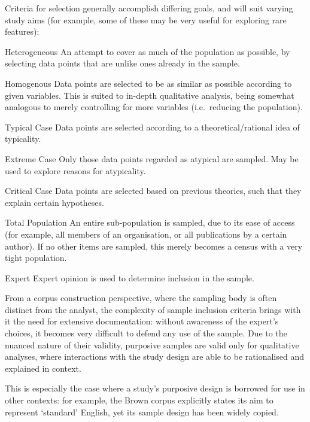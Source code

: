 Criteria for selection generally accomplish differing goals, and will suit varying study aims\cite{advice2000study} (for example, some of these may be very useful for exploring rare features):

\begin{itemizeTitle}
    \item[Heterogeneous] An attempt to cover as much of the population as possible, by selecting data points that are unlike ones already in the sample.
    \item[Homogenous] Data points are selected to be as similar as possible according to given variables.  This is suited to in-depth qualitative analysis, being somewhat analogous to merely controlling for more variables (i.e.\ reducing the population).
    \item[Typical Case] Data points are selected according to a theoretical/rational idea of typicality.
    \item[Extreme Case] Only those data points regarded as atypical are sampled.  May be used to explore reasons for atypicality.
    \item[Critical Case] Data points are selected based on previous theories, such that they explain certain hypotheses.
    \item[Total Population] An entire sub-population is sampled, due to its ease of access (for example, all members of an organisation, or all publications by a certain author).  If no other items are sampled, this merely becomes a census with a very tight population.
    \item[Expert] Expert opinion is used to determine inclusion in the sample.
\end{itemizeTitle}

From a corpus construction perspective, where the sampling body is often distinct from the analyst, the complexity of sample inclusion criteria brings with it the need for extensive documentation: without awareness of the expert's choices, it becomes very difficult to defend any use of the sample.  Due to the nuanced nature of their validity, purposive samples are valid only for qualitative analyses, where interactions with the study design are able to be rationalised and explained in context.

This is especially the case where a study's purposive design is borrowed for use in other contexts: for example, the Brown corpus explicitly states its aim to represent `standard' English, yet its sample design has been widely copied\cite{hundt1999manual,shastri1988kolhapur,mcenery2004lancaster}.

